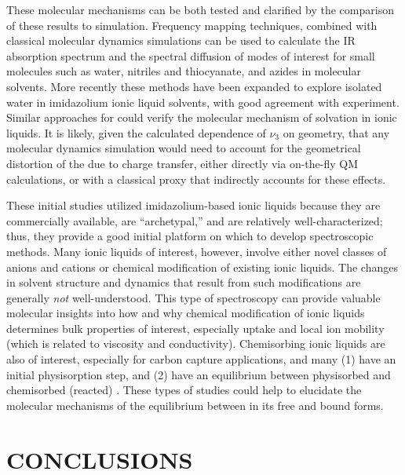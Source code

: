 \documentclass[%
  class = book,%
  crop = false,%
  float = true,%
  multi = true,%
  preview = false,%
]{standalone}
\let\cite\autocite
\newcommand{\caps}[1]{\uppercase{#1}}
\begin{document}
{These molecular mechanisms can be both tested and clarified by the comparison of these results to simulation. Frequency mapping techniques, combined with classical molecular dynamics simulations can be used to calculate the IR absorption spectrum and the spectral diffusion of modes of interest for small molecules such as water,\cite{steinelCPL-04,Asbury2004,Corcelli2004} nitriles and thiocyanate,\cite{Choi2008,Lindquist2008} and azides\cite{liJPC-06,Li2006} in molecular solvents. More recently these methods have been expanded to explore isolated water in imidazolium ionic liquid solvents\cite{Terranova2014}, with good agreement with experiment.\cite{wongJPCB-13} Similar approaches for  could verify the molecular mechanism of  solvation in ionic liquids. It is likely, given the calculated dependence of \(\nu_3\) on  geometry, that any molecular dynamics simulation would need to account for the geometrical distortion of the  due to charge transfer, either directly via on-the-fly QM calculations, or with a classical proxy that indirectly accounts for these effects.

These initial studies utilized imidazolium-based ionic liquids because they are commercially available, are ``archetypal,'' and are relatively well-characterized; thus, they provide a good initial platform on which to develop spectroscopic methods. Many ionic liquids of interest, however, involve either novel classes of anions and cations or chemical modification of existing ionic liquids. The changes in solvent structure and dynamics that result from such modifications are generally \textit{not} well-understood. This type of spectroscopy can provide valuable molecular insights into how and why chemical modification of ionic liquids determines bulk properties of interest, especially  uptake and local ion mobility (which is related to viscosity and conductivity). Chemisorbing ionic liquids are also of interest, especially for carbon capture applications, and many (1) have an initial physisorption step, and (2) have an equilibrium between physisorbed and chemisorbed (reacted) . These types of studies could help to elucidate the molecular mechanisms of the equilibrium between  in its free and bound forms.

\section{\texorpdfstring{\caps{Conclusions}}{Conclusions}}
\label{sec:anions_conclusions}

}
\end{document}

